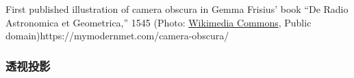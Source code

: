 \documentclass{beamer}
\begin{document}
{{{{\begin{frame}
  \label{caption-attachment-494307}First published illustration of camera
  obscura in Gemma Frisius' book ``De Radio Astronomica et Geometrica,'' 1545
  (Photo:
  \href{https://commons.wikimedia.org/wiki/File:1545_gemma_frisius_-_camera-obscura-sonnenfinsternis_1545-650x337.jpg}{Wikimedia
  Commons}, Public domain)https://mymodernmet.com/camera-obscura/
\end{frame}}{\begin{frame}
  \frametitle{透视投影}
  
  \
  
  \
  
  {\hspace{3em}}
  \begin{eqnarray*}
    &  & 
  \end{eqnarray*}
\end{frame}}{\begin{frame}
  \frametitle{}
  
  \
  
  {\hspace{3em}}
\end{frame}}{\begin{frame}
  \frametitle{}
  

\end{frame}}}}}
\end{document}
